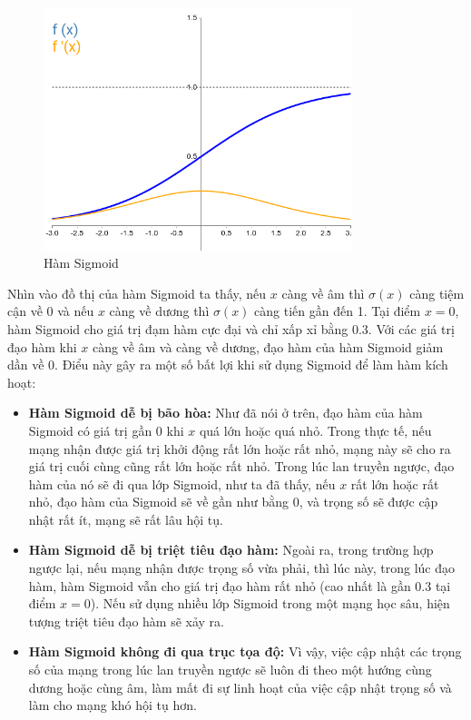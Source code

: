 \begin{figure}[H]
    \centering
    \includegraphics[width=9cm]{./content/materials/sigmoid.png}
    \caption{Hàm Sigmoid}
\end{figure}

Nhìn vào đồ thị của hàm Sigmoid ta thấy, nếu $x$ càng về âm thì $\sigma(x)$ càng tiệm cận về 0 và nếu $x$ càng về dương thì $\sigma(x)$ càng tiến gần đến 1. Tại điểm $x=0$, hàm Sigmoid cho giá trị đạm hàm cực đại và chỉ xấp xỉ bằng 0.3. Với các giá trị đạo hàm khi $x$ càng về âm và càng về dương, đạo hàm của hàm Sigmoid giảm dần về 0. Điểu này gây ra một số bất lợi khi sử dụng Sigmoid để làm hàm kích hoạt:

\begin{itemize}
    \item \textbf{Hàm Sigmoid dễ bị bão hòa:} Như đã nói ở trên, đạo hàm của hàm Sigmoid có giá trị gần 0 khi $x$ quá lớn hoặc quá nhỏ. Trong thực tế, nếu mạng nhận được giá trị khởi động rất lớn hoặc rất nhỏ, mạng này sẽ cho ra giá trị cuối cùng cũng rất lớn hoặc rất nhỏ. Trong lúc lan truyền ngược, đạo hàm của nó sẽ đi qua lớp Sigmoid, như ta đã thấy, nếu $x$ rất lớn hoặc rất nhỏ, đạo hàm của Sigmoid sẽ về gần như bằng 0, và trọng số sẽ được cập nhật rất ít, mạng sẽ rất lâu hội tụ.
    \item \textbf{Hàm Sigmoid dễ bị triệt tiêu đạo hàm:} Ngoài ra, trong trường hợp ngược lại, nếu mạng nhận được trọng số vừa phải, thì lúc này, trong lúc đạo hàm, hàm Sigmoid vẫn cho giá trị đạo hàm rất nhỏ (cao nhất là gần 0.3 tại điểm $x=0$). Nếu sử dụng nhiều lớp Sigmoid trong một mạng học sâu, hiện tượng triệt tiêu đạo hàm sẽ xảy ra.
    \item \textbf{Hàm Sigmoid không đi qua trục tọa độ:} Vì vậy, việc cập nhật các trọng số  của mạng trong lúc lan truyền ngược sẽ luôn đi theo một hướng cùng dương hoặc cùng âm, làm mất đi sự linh hoạt của việc cập nhật trọng số và làm cho mạng khó hội tụ hơn.
\end{itemize}

